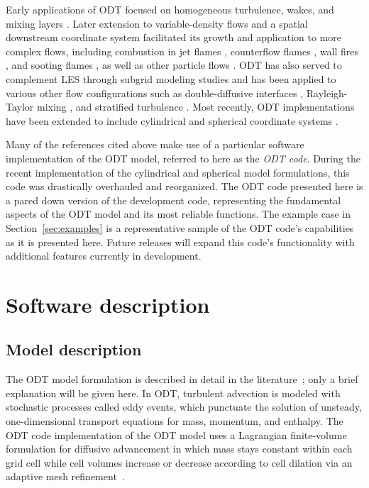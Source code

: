 \documentclass[preprint,12pt, a4paper]{elsarticle}
\begin{document}
Early applications of ODT focused on homogeneous turbulence, wakes, and mixing layers \cite{Kerstein_1999,Kerstein_2000,Kerstein_2001}. Later extension to variable-density flows and a spatial downstream coordinate system facilitated its growth and application to more complex flows, including combustion in jet flames \cite{Echekki_2001,Hewson_2001,Hewson_2002,Lignell_2012,Punati_2011,Abdelsamie_2017,Lignell_2017, Goshayeshi_2015}, counterflow flames \cite{Jozefik_2015}, wall fires \cite{Monson_2016}, and sooting flames \cite{Lignell_2015,Hewson_2006,Hewson_2009,Lignell_2015b,Ricks_2010}, as well as other particle flows \cite{Sun_2017,Schmidt_2009,Sun_2014,Fistler_2017}. ODT has also served to complement LES through subgrid modeling studies \cite{Cao_2008,Schmidt_2003,Schmidt_2010} and has been applied to various other flow configurations such as double-diffusive interfaces \cite{GonzalezJuez_2011}, Rayleigh-Taylor mixing \cite{GonzalezJuez_2013}, and stratified turbulence \cite{Wunsch_2001}. Most recently, ODT implementations have been extended to include cylindrical and spherical coordinate systems \cite{Lignell_2018,Klein_2018,Klein_2019}.

Many of the references cited above make use of a particular software implementation of the ODT model, referred to here as the \emph{ODT code}. During the recent implementation of the cylindrical and spherical model formulations, this code was drastically overhauled and reorganized. The ODT code presented here is a pared down version of the development code, representing the fundamental aspects of the ODT model and its most reliable functions. The example case in Section~\ref{sec:examples} is a representative sample of the ODT code's capabilities as it is presented here. Future releases will expand this code's functionality with additional features currently in development. 

\section{Software description}
\label{sec:description}

\subsection{Model description}
\label{sub:model_description}

The ODT model formulation is described in detail in the literature~\cite{Kerstein_1999,Kerstein_2001,Ashurst_2005,Lignell_2018,Lignell_2013}; only a brief explanation will be given here. In ODT, turbulent advection is modeled with stochastic processes called eddy events, which punctuate the solution of unsteady, one-dimensional transport equations for mass, momentum, and enthalpy. The ODT code implementation of the ODT model uses a Lagrangian finite-volume formulation for diffusive advancement in which mass stays constant within each grid cell while cell volumes increase or decrease according to cell dilation via an adaptive mesh refinement~\cite{Lignell_2013}.
\end{document}
